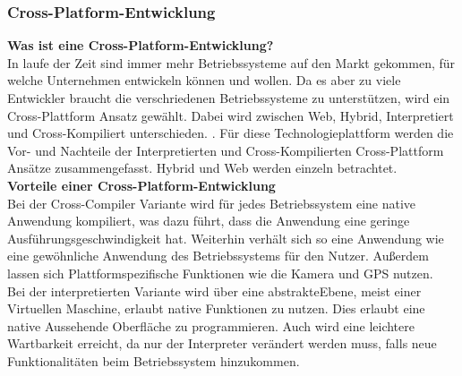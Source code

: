 \documentclass[ngerman]{article}
\begin{document}
    \subsubsection{Cross-Platform-Entwicklung}
    \textbf{Was ist eine Cross-Platform-Entwicklung?}\\
    In laufe der Zeit sind immer mehr Betriebssysteme auf den Markt gekommen, für welche Unternehmen entwickeln können und wollen. Da es aber zu viele Entwickler braucht die verschriedenen Betriebssysteme zu unterstützen, wird ein Cross-Plattform Ansatz gewählt. Dabei wird zwischen Web, Hybrid, Interpretiert und Cross-Kompiliert unterschieden. \cite{Cross-platform development of smartphone applications: An evaluation of React Native}. Für diese Technologieplattform werden die Vor- und Nachteile der Interpretierten und Cross-Kompilierten Cross-Plattform Ansätze zusammengefasst. Hybrid und Web werden einzeln betrachtet.\\
    \textbf{Vorteile einer Cross-Platform-Entwicklung}\\
    Bei der Cross-Compiler Variante wird für jedes Betriebssystem eine native Anwendung kompiliert, was dazu führt, dass die Anwendung eine geringe Ausführungsgeschwindigkeit hat. Weiterhin verhält sich so eine Anwendung wie eine gewöhnliche Anwendung des Betriebssystems für den Nutzer. Außerdem lassen sich Plattformspezifische Funktionen wie die Kamera und GPS nutzen.\\
    Bei der interpretierten Variante wird über eine abstrakteEbene, meist einer Virtuellen Maschine,  erlaubt native Funktionen zu nutzen. Dies erlaubt eine native Aussehende Oberfläche zu programmieren. Auch wird eine leichtere Wartbarkeit erreicht, da nur der Interpreter verändert werden muss, falls neue Funktionalitäten beim Betriebssystem hinzukommen. \cite{Cross-platform development of smartphone applications: An evaluation of React Native}\\
\end{document}
